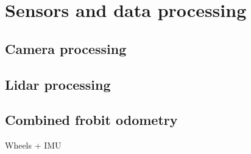 \section{Sensors and data processing} %
\label{sec:mr_sensors_and_data_processing}

	\subsection{Camera processing} %
	\label{sub:mr_camera_processing}
	

	\subsection{Lidar processing} %
	\label{sub:mr_lidar_processing}
	

	\subsection{Combined frobit odometry} %
	\label{sub:mr_combined_frobit_odometry}
	Wheels + IMU
	

